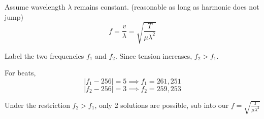\begin{solution}
    Assume wavelength $\lambda$ remains constant. (reasonable as long as harmonic does not jump)
    \[f = \frac{v}{\lambda} = \sqrt{\frac{T}{\mu \lambda^2}}\]

    Label the two frequencies $f_1$ and $f_2$. Since tension increases, $f_2 > f_1$. 

    For beats, 
    \[\left|f_1 - 256\right| = 5 \implies f_1 = 261, 251 \]
    \[\left|f_2 - 256\right| = 3 \implies f_2 = 259, 253 \]

    Under the restriction $f_2 > f_1$, only 2 solutions are possible, sub into our $f = \sqrt{\frac{T}{\mu \lambda^2}}$
    
\end{solution}

